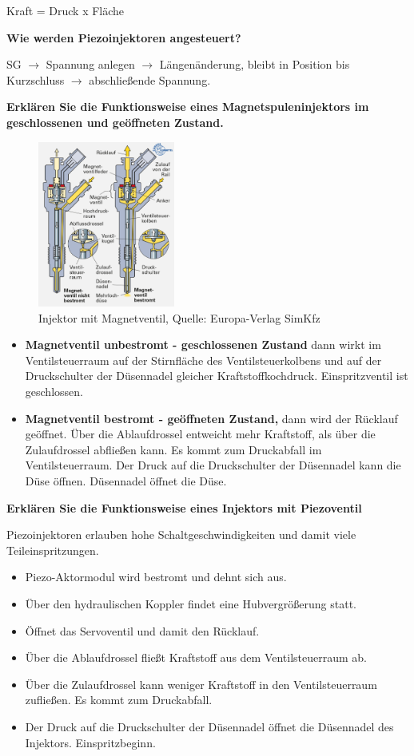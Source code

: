 Kraft = Druck x Fläche

\textbf{Wie werden Piezoinjektoren angesteuert?}

SG $\to$ Spannung anlegen $\to$ Längenänderung, bleibt in Position
bis Kurzschluss $\to$ abschließende Spannung.

\textbf{Erklären Sie die Funktionsweise eines Magnetspuleninjektors im
geschlossenen und geöffneten Zustand.}

\begin{figure}[!ht]%
\centering
\includegraphics[width=0.4\textwidth]{images/CR/Wirkungsweise-Magnetventilinjektors.png}
\caption{Injektor mit Magnetventil, Quelle: Europa-Verlag SimKfz}
\end{figure}

\begin{itemize}
\item
  \textbf{Magnetventil unbestromt - geschlossenen Zustand} dann wirkt im
  Ventilsteuerraum auf der Stirnfläche des Ventilsteuerkolbens und auf
  der Druckschulter der Düsennadel gleicher Kraftstoffkochdruck.
  Einspritzventil ist geschlossen.
\item
  \textbf{Magnetventil bestromt - geöffneten Zustand,} dann wird der
  Rücklauf geöffnet. Über die Ablaufdrossel entweicht mehr Kraftstoff,
  als über die Zulaufdrossel abfließen kann. Es kommt zum Druckabfall im
  Ventilsteuerraum. Der Druck auf die Druckschulter der Düsennadel kann
  die Düse öffnen. Düsennadel öffnet die Düse.
\end{itemize}

\textbf{Erklären Sie die Funktionsweise eines Injektors mit Piezoventil}

Piezoinjektoren erlauben hohe Schaltgeschwindigkeiten und damit viele
Teileinspritzungen.

\begin{itemize}
\item
  Piezo-Aktormodul wird bestromt und dehnt sich aus.
\item
  Über den hydraulischen Koppler findet eine Hubvergrößerung statt.
\item
  Öffnet das Servoventil und damit den Rücklauf.
\item
  Über die Ablaufdrossel fließt Kraftstoff aus dem Ventilsteuerraum ab.
\item
  Über die Zulaufdrossel kann weniger Kraftstoff in den Ventilsteuerraum
  zufließen. Es kommt zum Druckabfall.
\item
  Der Druck auf die Druckschulter der Düsennadel öffnet die Düsennadel
  des Injektors. Einspritzbeginn.
\end{itemize}
